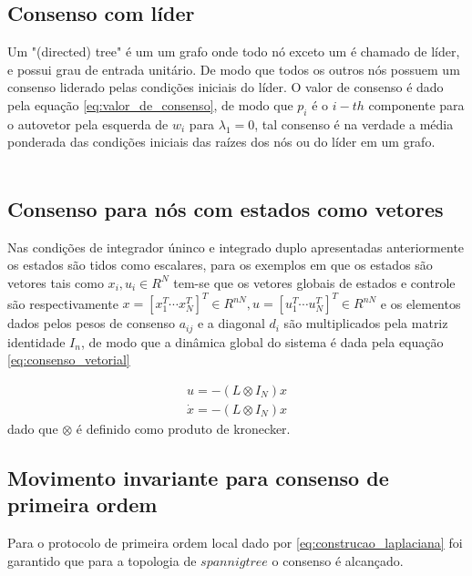 \subsection{Consenso com líder}
Um "(directed) tree" é um um grafo onde todo nó exceto um é chamado de líder, e possui grau de entrada unitário. De modo que todos os outros nós possuem um consenso liderado pelas condições iniciais do líder.
O valor de consenso é dado pela equação \ref{eq:valor_de_consenso}, de modo que $p_{i}$ é o $i-{th}$ componente para o autovetor pela esquerda de $w_{i}$ para $\lambda_{1} = 0$, tal consenso é na verdade a média ponderada das condições iniciais das raízes dos nós ou do líder em um grafo. 
\\
\\
\subsection{Consenso para nós com estados como vetores}
Nas condições de integrador úninco e integrado duplo apresentadas anteriormente os estados são tidos como escalares, para os exemplos em que os estados são vetores tais como $x_{i}, u_{i} \in R^{N}$ tem-se que os vetores globais de estados e controle são respectivamente $x = [x_{1}^{T} \cdots x_{N}^{T}]^{T} \in R^{nN} , 
u = [u_{1}^{T}  \cdots u_{N}^{T}]^{T} \in R^{nN} $ e os elementos dados pelos pesos de consenso $a_{ij}$ e a diagonal $d_{i}$ são multiplicados pela matriz identidade $I_{n}$, de modo que a dinâmica global do sistema é dada pela equação \ref{eq:consenso_vetorial}

\begin{equation}\label{eq:consenso_vetorial}
 \begin{aligned}
    u = -(L \otimes I_{N})x \\
    \dot x = -(L \otimes I_{N}) x
    \end{aligned}
\end{equation}
dado que $\otimes$ é definido como produto de kronecker.

\subsection{Movimento invariante para consenso de primeira ordem}
Para o protocolo de primeira ordem local dado por \ref{eq:construcao_laplaciana} foi garantido que para a topologia de $spannig tree$ o consenso é alcançado. 



